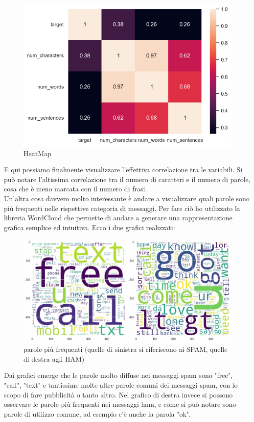 \documentclass[]{article}
\begin{document}
        \begin{figure}[H]
            \centering
            \includegraphics[width=0.7\linewidth]{images/matrice_corr.png}
            \caption{HeatMap}
            \label{fig:enter-label}
        \end{figure}

        E qui possiamo finalmente visualizzare l'effettiva correlazione tra le variabili. Si può notare l'altissima correlazione tra il numero di caratteri e il numero di parole, cosa che è meno marcata con il numero di frasi.\\
        Un'altra cosa davvero molto interessante è andare a visualizzare quali parole sono più frequenti nelle rispettive categoria di messaggi. Per fare ciò ho utilizzato la libreria WordCloud che permette di andare a generare una rappresentazione grafica semplice ed intuitiva. Ecco i due grafici realizzati:

        \begin{figure}[H]
            \centering
            \includegraphics[width=0.7\linewidth]{images/wordCloudSpam.jpg}
            \caption{parole più frequenti (quelle di sinistra si riferiscono ai SPAM, quelle di destra agli HAM)}
            \label{fig:enter-label}
        \end{figure}

        Dai grafici emerge che le parole molto diffuse nei messaggi spam sono "free", "call", "text" e tantissime molte altre parole comuni dei messaggi spam, con lo scopo di fare pubblicità o tanto altro. Nel grafico di destra invece si possono osservare le parole più frequenti nei messaggi ham, e come si può notare sono parole di utilizzo comune, ad esempio c'è anche la parola "ok".
\end{document}
